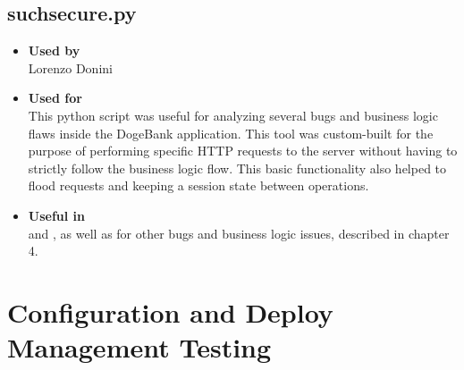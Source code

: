 \subsection*{suchsecure.py}
\begin{itemize}
	\item \textbf{Used by}\\ Lorenzo Donini
	\item \textbf{Used for}\\ This python script was useful for analyzing several bugs and business logic flaws inside the DogeBank application. This tool was custom-built for the purpose of performing specific HTTP requests to the server without having to strictly follow the business logic flow. This basic functionality also helped to flood requests and keeping a session state between operations.
	\item \textbf{Useful in}\\  and , as well as for other bugs and business logic issues, described in chapter 4.
\end{itemize}


\clearpage
\section{Configuration and Deploy Management Testing}

